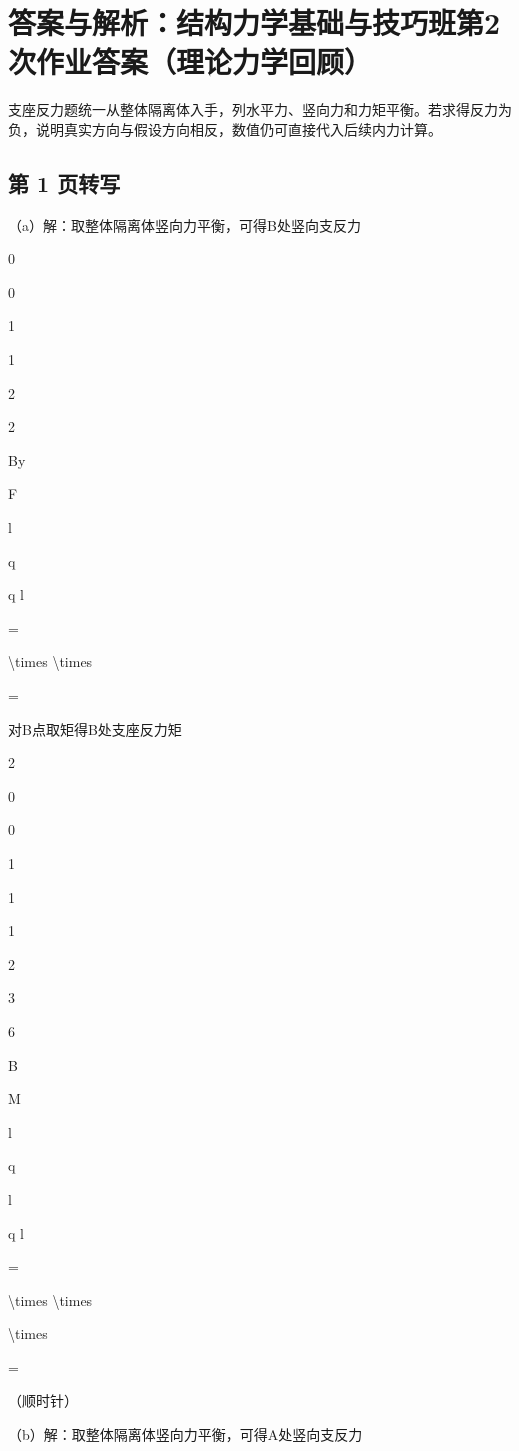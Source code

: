 \section{答案与解析：结构力学基础与技巧班第2次作业答案（理论力学回顾）}
\begin{analysisbox}
支座反力题统一从整体隔离体入手，列水平力、竖向力和力矩平衡。若求得反力为负，说明真实方向与假设方向相反，数值仍可直接代入后续内力计算。
\end{analysisbox}
\subsection*{第 1 页转写}
（a）解：取整体隔离体竖向力平衡，可得B处竖向支反力



0

0

1

1

2

2

By

F

l

q

q l

=

\textbackslash{}times \textbackslash{}times

=



对B点取矩得B处支座反力矩

2

0

0

1

1

1

2

3

6

B

M

l

q

l

q l

=

\textbackslash{}times \textbackslash{}times

\textbackslash{}times

=

（顺时针）

（b）解：取整体隔离体竖向力平衡，可得A处竖向支反力



